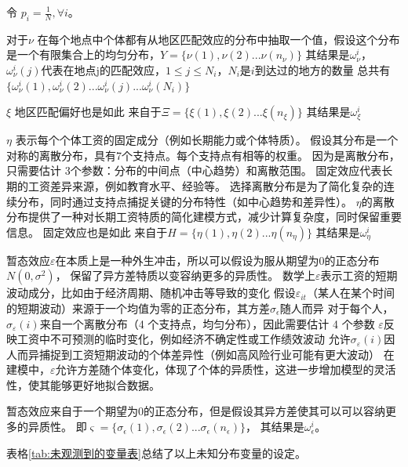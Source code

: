 \documentclass[a4paper,12pt,oneside, fontset=mac]{ctexbook} %
\begin{document}
令 $p_i = \frac{1}{N}, \forall i$。


对于$\nu$
在每个地点中个体都有从地区匹配效应的分布中抽取一个值，假设这个分布是一个有限集合上的均匀分布，$Y=\{\nu(1),\nu(2)...\nu(n_{\nu})\}$
其结果是$\omega^{i}_{\nu}$，$\omega^{i}_{\nu}(j)$代表在地点j的匹配效应，$1\leqslant j\leqslant N_i$，$N_i$是$i$到达过的地方的数量
总共有$\{\omega^{i}_{\nu}(1),\omega^{i}_{\nu}(2)...\omega^{i}_{\nu}(j)...\omega^{i}_{\nu}(N_i)\}$

$\xi$
地区匹配偏好也是如此
来自于$\Xi=\{\xi(1),\xi(2)...\xi(n_{\xi})\}$
其结果是$\omega^{i}_{\xi}$

$\eta$ 表示每个个体工资的固定成分（例如长期能力或个体特质）。
假设其分布是一个对称的离散分布，具有7个支持点。每个支持点有相等的权重。
因为是离散分布，只需要估计 3个参数：分布的中间点（中心趋势）和离散范围。
固定效应代表长期的工资差异来源，例如教育水平、经验等。
选择离散分布是为了简化复杂的连续分布，同时通过支持点捕捉关键的分布特性（如中心趋势和差异性）。
$\eta$的离散分布提供了一种对长期工资特质的简化建模方式，减少计算复杂度，同时保留重要信息。
固定效应也是如此
来自于$H=\{\eta(1),\eta(2)...\eta(n_\eta)\}$
其结果是$\omega^{i}_{\eta}$


暂态效应$\varepsilon$在本质上是一种外生冲击，所以可以假设为服从期望为$0$的正态分布$N(0,\sigma^2)$，
保留了异方差特质以变容纳更多的异质性。
数学上$\varepsilon$表示工资的短期波动成分，比如由于经济周期、随机冲击等导致的变化
假设$\varepsilon_{it}$（某人在某个时间的短期波动）来源于一个均值为零的正态分布，其方差$\sigma_{\epsilon}$随人而异
对于每个人，$\sigma_\varepsilon(i)$来自一个离散分布（4 个支持点，均匀分布），因此需要估计 4 个参数
$\varepsilon$反映工资中不可预测的临时变化，例如经济不确定性或工作绩效波动
允许$\sigma_\varepsilon(i)$因人而异捕捉到工资短期波动的个体差异性（例如高风险行业可能有更大波动）
在建模中，$\varepsilon$允许方差随个体变化，体现了个体的异质性，这进一步增加模型的灵活性，使其能够更好地拟合数据。

暂态效应来自于一个期望为$0$的正态分布，但是假设其异方差使其可以可以容纳更多的异质性。
即$\varsigma=\{\sigma_{\epsilon}(1),\sigma_{\epsilon}(2)...\sigma_{\epsilon}(n_{\epsilon})\}$，
其结果是$\omega^{i}_{\epsilon}$。




表格\ref{tab:未观测到的变量表}总结了以上未知分布变量的设定。
\end{document}
